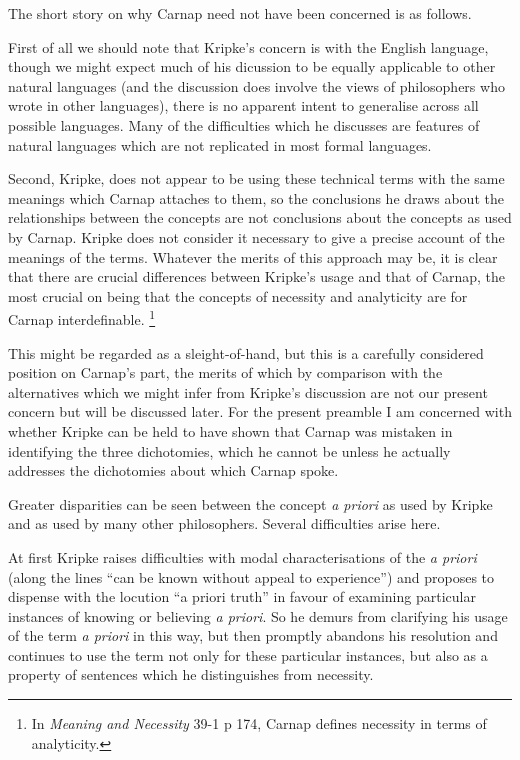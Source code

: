 The short story on why Carnap need not have been concerned is as follows.

First of all we should note that Kripke's concern is with the English
language, though we might expect much of his dicussion to be equally
applicable to other natural languages (and the discussion does involve
the views of philosophers who wrote in other languages), there is no
apparent intent to generalise across all possible languages.
Many of the difficulties which he discusses are features of natural
languages which are not replicated in most formal languages.

Second, Kripke, does not appear to be using these technical terms
with the same meanings which Carnap attaches to them, so the conclusions
he draws about the relationships between the concepts are not
conclusions about the concepts as used by Carnap.
Kripke does not consider it necessary to give a precise account
of the meanings of the terms.
Whatever the merits of this approach may be, it is clear that there are
crucial differences between Kripke's usage and that of Carnap, the most
crucial on being that the concepts of necessity and analyticity are for
Carnap interdefinable.
\footnote{In \emph{Meaning and Necessity} \cite{carnap47} 39-1 p 174, Carnap defines necessity in terms
of analyticity.}

This might be regarded as a sleight-of-hand, but this is a carefully
considered position on Carnap's part, the merits of which by comparison
with the alternatives which we might infer from Kripke's discussion are
not our present concern but will be discussed later.
For the present preamble I am concerned with whether Kripke can be held
to have shown that Carnap was mistaken in identifying the three dichotomies,
which he cannot be unless he actually addresses the dichotomies about
which Carnap spoke.

Greater disparities can be seen between the concept \emph{a priori} as used
by Kripke and as used by many other philosophers.
Several difficulties arise here.

At first Kripke raises difficulties with modal characterisations of the
\emph{a priori} (along the lines ``can be known without appeal to experience'')
and proposes to dispense with the locution ``a priori truth'' in favour
of examining particular instances of knowing or believing \emph{a priori}.
So he demurs from clarifying his usage of the term \emph{a priori} in this
way, but then promptly abandons his resolution and continues to use the
term not only for these particular instances, but also as a property of
sentences which he distinguishes from necessity.

